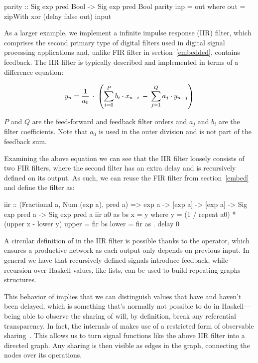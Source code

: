 \documentclass[../paper.tex]{subfiles}
\begin{document}
\begin{code}
parity :: Sig exp pred Bool -> Sig exp pred Bool
parity inp = out where
  out = zipWith xor (delay false out) input
\end{code}

As a larger example, we implement a infinite impulse response (IIR) filter, which comprises the second primary type of digital filters used in digital signal processing applications and, unlike FIR filter in section~\ref{embedded}, contains feedback. The IIR filter is typically described and implemented in terms of a difference equation:

\begin{equation}
y_{n} = {1 \over a_{0}} \: \cdot \: \left( \sum_{i=0}^{P} b_{i} \cdot x_{n-i} \: - \: \sum_{j=1}^{Q} a_{j} \cdot y_{n-j} \right)
\end{equation}
\vspace{1mm}

\noindent $P$ and $Q$ are the feed-forward and feedback filter orders and $a_{j}$ and $b_{i}$ are the filter coefficients. Note that $a_{0}$ is used in the outer division and is not part of the feedback sum.

Examining the above equation we can see that the IIR filter loosely consists of two FIR filters, where the second filter has an extra delay and is recursively defined on its output. As such, we can reuse the FIR filter from section~\ref{embed} and define the filter as:

\begin{code}
iir :: (Fractional a, Num (exp a), pred a) => exp a -> [exp a] -> [exp a]
  -> Sig exp pred a -> Sig exp pred a
iir a0 as bs x = y
  where
    y = (1 / repeat a0) * (upper x - lower y)
    upper = fir bs
    lower = fir as . delay 0
\end{code}

A circular definition of  in the IIR filter is possible thanks to the  operator, which ensures a productive network as each output only depends on previous input. In general we have that recursively defined signals introduce feedback, while recursion over Haskell values, like lists, can be used to build repeating graphs structures.

This behavior of  implies that we can distinguish values that have and haven't been delayed, which is something that's normally not possible to do in Haskell---being able to observe the sharing of  will, by definition, break any referential transparency. In fact, the internals of  makes use of a restricted form of observable sharing~\cite{claessen1999, gill2009}. This allows us to turn signal functions like the above IIR filter into a directed graph. Any sharing is then visible as edges in the graph, connecting the nodes over its operations.
\end{document}
